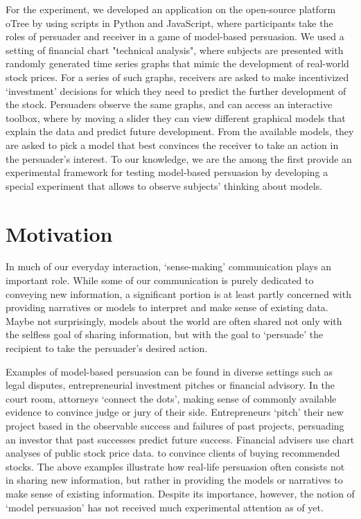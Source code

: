 \documentclass[11pt, a4paper, leqno]{article}
\begin{document}
For the experiment, we developed an application on the open-source platform oTree by \cite{chen2016otree} using scripts in Python and JavaScript, where participants take the roles of persuader and receiver in a game of model-based persuasion. We used a setting of financial chart "technical analysis", where subjects are presented with randomly generated time series graphs that mimic the development of real-world stock prices. For a series of such graphs, receivers are asked to make incentivized `investment' decisions for which they need to predict the further development of the stock. Persuaders observe the same graphs, and can access an interactive toolbox, where by moving a slider they can view different graphical models that explain the data and predict future development. From the available models, they are asked to pick a model that best convinces the receiver to take an action in the persuader's interest. To our knowledge, we are the among the first provide an experimental framework for testing model-based persuasion by developing a special experiment that allows to observe subjects' thinking about models.


\section{Motivation}

In much of our everyday interaction, `sense-making' communication plays an important role. While some of our communication is purely dedicated to conveying new information, a significant portion is at least partly concerned with providing narratives or models to interpret and make sense of existing data. Maybe not surprisingly, models about the world are often shared not only with the selfless goal of sharing information, but with the goal to `persuade' the recipient to take the persuader's desired action.

Examples of model-based persuasion can be found in diverse settings such as legal disputes, entrepreneurial investment pitches or financial advisory. In the court room, attorneys  `connect the dots', making sense of commonly available evidence to convince judge or jury of their side. Entrepreneurs `pitch' their new project based in the observable success and failures of past projects, persuading an investor that past successes predict future success. Financial advisers use chart analyses of public stock price data. to convince clients of buying recommended stocks. The above examples illustrate how real-life persuasion often consists not in sharing new information, but rather in providing the models or narratives to make sense of existing information. Despite its importance, however, the notion of `model persuasion' has not received much experimental attention as of yet. 
\end{document}
